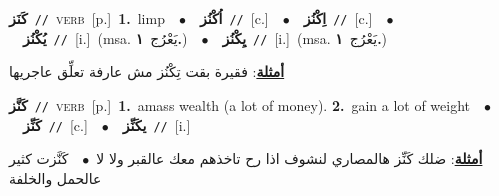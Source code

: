 \documentclass[10pt,a4paper,twoside]{article} %
\begin{document}
\begin{multicols}{2}
{\setlength\topsep{0pt}\textbf{\foreignlanguage{arabic}{كَنَز}}\ {\color{gray}\texttt{//}\color{black}}\ \textsc{verb}\ [p.]\ \textbf{1.}~limp\ \ $\bullet$\ \ \setlength\topsep{0pt}\textbf{\foreignlanguage{arabic}{اُكْنُز}}\ {\color{gray}\texttt{//}\color{black}}\ [c.]\ \ $\bullet$\ \ \setlength\topsep{0pt}\textbf{\foreignlanguage{arabic}{اِكْنُز}}\ {\color{gray}\texttt{//}\color{black}}\ [c.]\ \ $\bullet$\ \ \setlength\topsep{0pt}\textbf{\foreignlanguage{arabic}{يُكْنُز}}\ {\color{gray}\texttt{//}\color{black}}\ [i.]\ \color{gray}(msa. \foreignlanguage{arabic}{يَعْرُج}~\foreignlanguage{arabic}{\textbf{١.}})\color{black}\ \ $\bullet$\ \ \setlength\topsep{0pt}\textbf{\foreignlanguage{arabic}{يِكْنُز}}\ {\color{gray}\texttt{//}\color{black}}\ [i.]\ \color{gray}(msa. \foreignlanguage{arabic}{يَعْرُج}~\foreignlanguage{arabic}{\textbf{١.}})\color{black}\  \begin{flushright}\color{gray}\foreignlanguage{arabic}{\textbf{\underline{\foreignlanguage{arabic}{أمثلة}}}: فقيرة بقت تِكْنُز مش عارفة تعلِّق عاجريها}\end{flushright}\color{black}} \vspace{2mm}

{\setlength\topsep{0pt}\textbf{\foreignlanguage{arabic}{كَنَّز}}\ {\color{gray}\texttt{//}\color{black}}\ \textsc{verb}\ [p.]\ \textbf{1.}~amass wealth (a lot of money).  \textbf{2.}~gain a lot of weight\ \ $\bullet$\ \ \setlength\topsep{0pt}\textbf{\foreignlanguage{arabic}{كَنِّز}}\ {\color{gray}\texttt{//}\color{black}}\ [c.]\ \ $\bullet$\ \ \setlength\topsep{0pt}\textbf{\foreignlanguage{arabic}{يكَنِّز}}\ {\color{gray}\texttt{//}\color{black}}\ [i.]\  \begin{flushright}\color{gray}\foreignlanguage{arabic}{\textbf{\underline{\foreignlanguage{arabic}{أمثلة}}}: ضلك كَنِّز هالمصاري لنشوف اذا رح تاخذهم معك عالقبر ولا لا\ $\bullet$\ \  كَنَّزت كثير عالحمل والخلفة}\end{flushright}\color{black}} \vspace{2mm}


\end{multicols}
\end{document}
